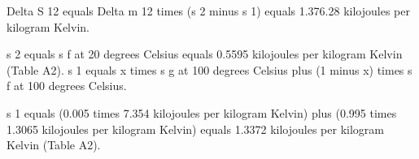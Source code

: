 Delta S 12 equals Delta m 12 times (s 2 minus s 1) equals 1.376.28 kilojoules per kilogram Kelvin.  

s 2 equals s f at 20 degrees Celsius equals 0.5595 kilojoules per kilogram Kelvin (Table A2).  
s 1 equals x times s g at 100 degrees Celsius plus (1 minus x) times s f at 100 degrees Celsius.  

s 1 equals (0.005 times 7.354 kilojoules per kilogram Kelvin) plus (0.995 times 1.3065 kilojoules per kilogram Kelvin) equals 1.3372 kilojoules per kilogram Kelvin (Table A2).